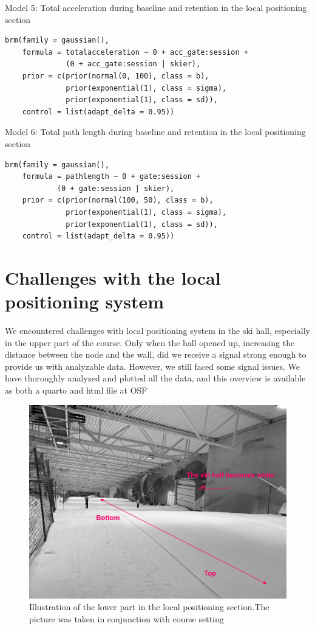 \documentclass{article}
\begin{document}
Model 5: Total acceleration during baseline and retention in the local positioning section

\begin{verbatim}
brm(family = gaussian(),
    formula = totalacceleration ~ 0 + acc_gate:session +
              (0 + acc_gate:session | skier),
    prior = c(prior(normal(0, 100), class = b),
              prior(exponential(1), class = sigma), 
              prior(exponential(1), class = sd)),
    control = list(adapt_delta = 0.95))
\end{verbatim}

Model 6: Total path length during baseline and retention in the local positioning section

\begin{verbatim}
brm(family = gaussian(),
    formula = pathlength ~ 0 + gate:session + 
            (0 + gate:session | skier),
    prior = c(prior(normal(100, 50), class = b), 
              prior(exponential(1), class = sigma),
              prior(exponential(1), class = sd)),
    control = list(adapt_delta = 0.95))
\end{verbatim}

\section{Challenges with the local positioning system} \label{appendixd}
We encountered challenges with local positioning system in the ski hall, especially in the upper part of the course. Only when the hall opened up, increasing the distance between the node and the wall, did we receive a signal strong enough to provide us with analyzable data. However, we still faced some signal issues. We have thoroughly analyzed and plotted all the data, and this overview is available as both a quarto and html file at OSF  


\begin{figure}[H]
\centering
\includegraphics{figurer/figure_appendix_LPS_wide.jpg}
\caption{Illustration of the lower part in the local positioning section.The picture was taken in conjunction with course setting}\label{fig: lpsissues}
\end{figure}
\end{document}
